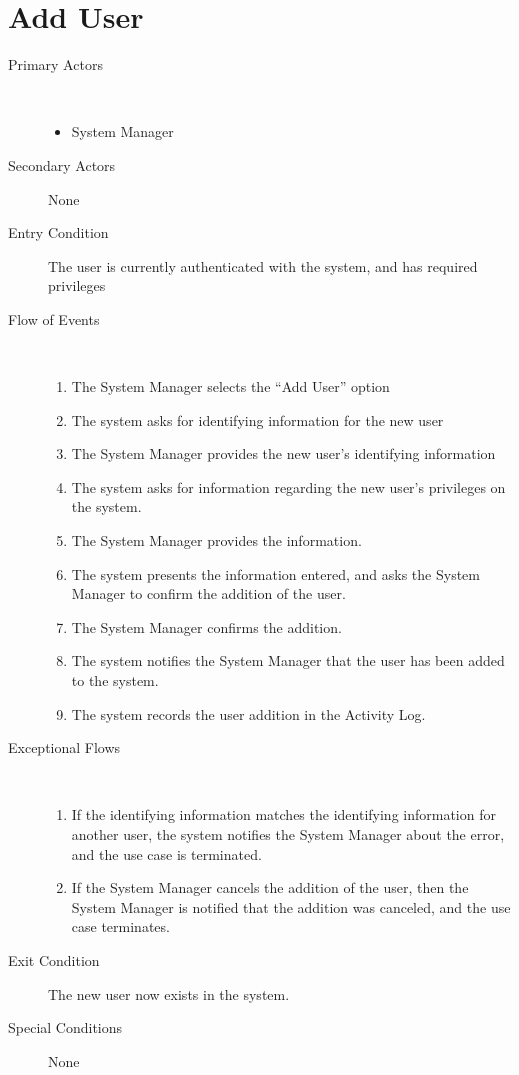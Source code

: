 \documentclass[a4paper,10pt]{report}
\begin{document}
\section{Add User}
\begin{description}
\item[Primary Actors] \
  \begin{itemize}
  \item System Manager
  \end{itemize}
\item[Secondary Actors] None
\item[Entry Condition]
  The user is currently authenticated with the system, and has required privileges
\item[Flow of Events] \
  \begin{enumerate}
  \item The System Manager selects the ``Add User'' option
  \item The system asks for identifying information for the new user
  \item The System Manager provides the new user's identifying information
  \item The system asks for information regarding the new user's privileges on the system.
  \item The System Manager provides the information.
  \item The system presents the information entered, and asks the System Manager to confirm the addition of the user.
  \item The System Manager confirms the addition.
  \item The system notifies the System Manager that the user has been added to the system.
    \item The system records the user addition in the Activity Log.
  \end{enumerate}
\item[Exceptional Flows] \
  \begin{enumerate}
  \item If the identifying information matches the identifying information for another user, the system notifies the System Manager about the error, and the use case is terminated.
  \item If the System Manager cancels the addition of the user, then the System Manager is notified that the addition was canceled, and the use case terminates.
  \end{enumerate}
\item[Exit Condition]
  The new user now exists in the system.
\item[Special Conditions] None
\end{description}
\end{document}

